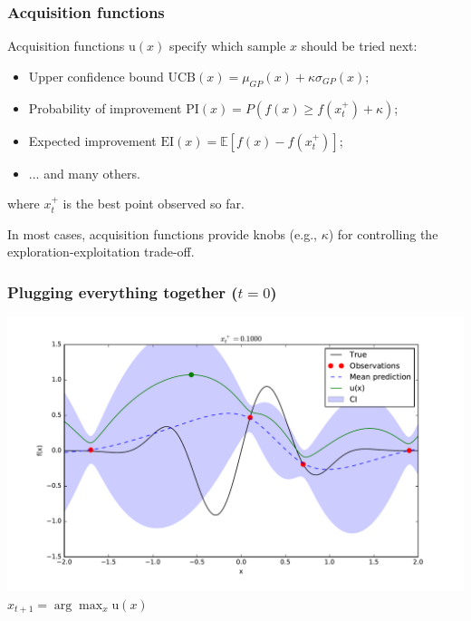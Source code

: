 \documentclass{beamer}
\begin{document}
\begin{frame}
    \frametitle{Acquisition functions}

    Acquisition functions $\text{u}(x)$ specify which sample $x$ should be tried next:

    \begin{itemize}
        \item Upper confidence bound
            $\text{UCB}(x) = \mu_{GP}(x) + \kappa \sigma_{GP}(x)$;
        \item Probability of improvement
            $\text{PI}(x) = P(f(x) \geq f(x_t^+) + \kappa) $;
        \item Expected improvement
            $\text{EI}(x) = \mathbb{E} [f(x) - f(x_t^+)] $;
        \item ... and many others.
    \end{itemize}

    where $x_t^+$ is the best point observed so far.

    \vspace{1em}

    In most cases, acquisition functions provide knobs (e.g., $\kappa$) for
    controlling the exploration-exploitation trade-off.

\end{frame}

\begin{frame}
    \frametitle{Plugging everything together ($t=0$)}
    \begin{center}
        \includegraphics[width=\textwidth]{code/fig4-0.pdf}\\
        $x_{t+1} = \arg \max_{x} \text{u}(x)$
    \end{center}
\end{frame}
\end{document}
